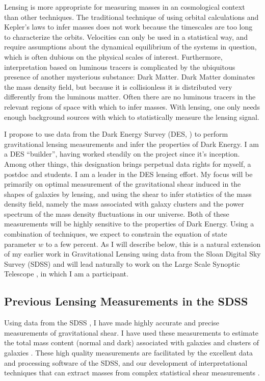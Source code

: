 \documentclass[12pt]{article}
\begin{document}
Lensing is more appropriate for measuring masses in an cosmological context
than other techniques.  The traditional technique of using orbital calculations
and Kepler's laws to infer masses does not work because the timescales are too
long to characterize the orbits. Velocities can only be used in a statistical
way, and require assumptions about the dynamical equilibrium of the systems in
question, which is often dubious on the physical scales of interest.
Furthermore, interpretation based on luminous tracers is complicated by the
ubiquitous presence of another mysterious substance: Dark Matter.  Dark Matter
dominates the mass density field, but because it is collisionless it is
distributed very differently from the luminous matter.  Often there are no
luminous tracers in the relevant regions of space with which to infer masses.
With lensing, one only needs enough background sources with which to
statistically measure the lensing signal.

I propose to use data from the Dark Energy Survey (DES, \cite{DESWhitePaper})
to perform gravitational lensing measurements and infer the properties of Dark
Energy.  I am a DES ``builder'', having worked steadily on the project since
it's inception.  Among other things, this designation brings perpetual data
rights for myself, a postdoc and students.  I am a leader in the DES lensing
effort.  My focus will be primarily on optimal measurement of the gravitational
shear induced in the shapes of galaxies by lensing, and using the shear to
infer statistics of the mass density field, namely the mass associated with
galaxy clusters and the power spectrum of the mass density fluctuations in our
universe. Both of these measurements will be highly sensitive to the properties
of Dark Energy.  Using a combination of techniques, we expect to constrain the
equation of state parameter $w$ to a few percent.  As I will describe below,
this is a natural extension of my earlier work in Gravitational Lensing using
data from the Sloan Digital Sky Survey (SDSS) and will lead naturally to work
on the Large Scale Synoptic Telescope \cite{lsstweb}, in which I am a
participant.

\subsection{Previous Lensing Measurements in the SDSS} \label{sec:sdssold}

Using data from the SDSS \cite{York00}, I have made highly accurate and precise
measurements of gravitational shear. I have used these measurements to estimate
the total mass content (normal and dark) associated with galaxies and clusters
of galaxies
\cite{fis00,Sheldon04,SheldonLensing07,JohnstonLensing07,SheldonM2L07}.  These
high quality measurements are facilitated by the excellent data and processing
software of the SDSS, and our development of interpretational techniques that
can extract masses from complex statistical shear measurements
\cite{JohnstonInvert07}.
\end{document}
